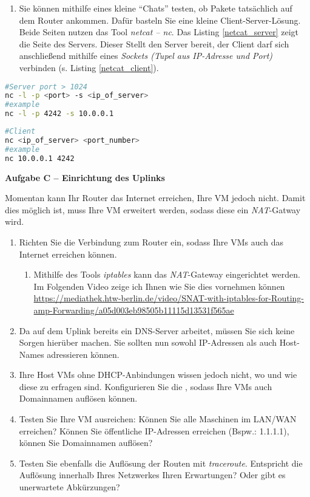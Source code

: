 \documentclass[paper=a4,fontsize=11pt]{scrartcl}%
\begin{document}
\begin{enumerate}
\begin{enumerate}
		\item Sie können mithilfe eines kleine \enquote{Chats} testen, ob Pakete tatsächlich auf dem Router ankommen. Dafür basteln Sie eine kleine  Client-Server-Lösung. Beide Seiten nutzen das Tool \emph{netcat -- \emph{nc}}. Das Listing \ref{netcat_server} zeigt die Seite des Servers. Dieser Stellt den Server bereit, der Client darf sich anschließend mithilfe eines \emph{Sockets (Tupel aus IP-Adresse und Port)} verbinden (s. Listing \ref{netcat_client}). 
	\end{enumerate}
	\begin{lstlisting}[style=Bash, language=Bash, label={netcat_server}]
#Server port > 1024 
nc -l -p <port> -s <ip_of_server>
#example
nc -l -p 4242 -s 10.0.0.1
		\end{lstlisting}
		
		\begin{lstlisting}[style=Bash, language=Bash, label={netcat_client}]
#Client 
nc <ip_of_server> <port_number>
#example
nc 10.0.0.1 4242
		\end{lstlisting}
	\begin{center}\Large{\textbf{Aufgabe C -- Einrichtung des Uplinks}}\end{center}\vskip0.25in
Momentan kann Ihr Router das Internet erreichen, Ihre VM jedoch nicht. Damit dies möglich ist, muss Ihre VM erweitert werden, sodass diese ein \emph{NAT}-Gatway wird. 
\begin{enumerate}
	\item Richten Sie die Verbindung zum Router ein, sodass Ihre VMs auch das Internet erreichen können.
	\begin{enumerate}
		\item Mithilfe des Tools \emph{iptables} kann das \emph{NAT}-Gateway eingerichtet werden. Im Folgenden Video zeige ich Ihnen wie Sie dies vornehmen können \url{https://mediathek.htw-berlin.de/video/SNAT-with-iptables-for-Routing-amp-Forwarding/a05d003eb98505b11115d13531f565ae}
	\end{enumerate}
	\item Da auf dem Uplink bereits ein DNS-Server arbeitet, müssen Sie sich keine Sorgen hierüber machen. Sie sollten nun sowohl IP-Adressen als auch Host-Names adressieren können.\\
	\item Ihre Host VMs ohne DHCP-Anbindungen wissen jedoch nicht, wo und wie diese zu erfragen sind. Konfigurieren Sie die , sodass Ihre VMs auch Domainnamen auflösen können.
	\item Testen Sie Ihre VM ausreichen: Können Sie alle Maschinen im LAN/WAN erreichen? Können Sie öffentliche IP-Adressen erreichen (Bspw.: 1.1.1.1), können Sie Domainnamen auflösen?
	\item Testen Sie ebenfalls die Auflösung der Routen mit \emph{traceroute}. Entspricht die Auflösung innerhalb Ihres Netzwerkes Ihren Erwartungen? Oder gibt es unerwartete Abkürzungen?
	\end{enumerate}
\end{enumerate}
\end{document}
